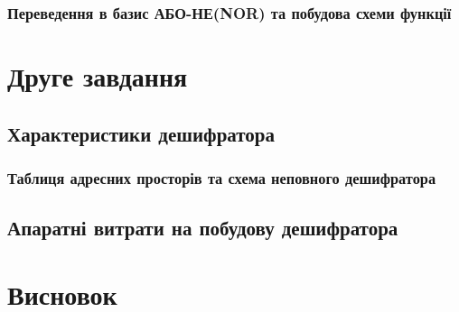 \subsection{Переведення в базис АБО-НЕ(NOR) та побудова схеми функції}

\chapter{Друге завдання}
\section{Характеристики дешифратора}

\subsection{Таблиця адресних просторів та схема неповного дешифратора}

\section{Апаратні витрати на побудову дешифратора}

\chapter{Висновок}
